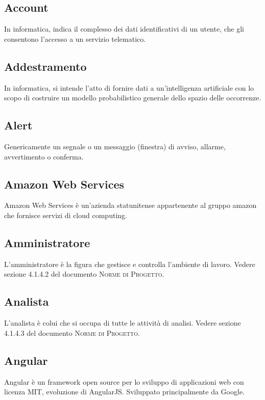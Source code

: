 

\subsection*{Account}
In informatica, indica il complesso dei dati identificativi di un utente, che gli consentono l'accesso a un servizio telematico.

\subsection*{Addestramento}
In informatica, si intende l'atto di fornire dati a un'intelligenza artificiale con lo scopo di costruire un modello probabilistico generale dello spazio delle occorrenze.

\subsection*{Alert}
Genericamente un segnale o un messaggio (finestra) di avviso, allarme, avvertimento o conferma.

\subsection*{Amazon Web Services}
Amazon Web Services è un'azienda statunitense appartenente al gruppo amazon che fornisce servizi di cloud computing.

\subsection*{Amministratore}
L’amministratore è la figura che gestisce e controlla l’ambiente di lavoro. Vedere sezione 4.1.4.2 del documento \textsc{Norme di Progetto}.

\subsection*{Analista}
L’analista è colui che si occupa di tutte le attività di analisi. Vedere sezione 4.1.4.3 del documento \textsc{Norme di Progetto}.

\subsection*{Angular}
Angular è un framework open source per lo sviluppo di applicazioni web con licenza MIT, evoluzione di AngularJS.
Sviluppato principalmente da Google.

